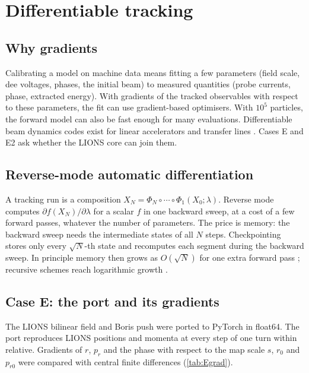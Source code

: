 \chapter{Differentiable tracking}\label{ch:differentiable}

\section{Why gradients}
Calibrating a model on machine data means fitting a few parameters (field scale, dee voltages, phases, the initial beam)
to measured quantities (probe currents, phase, extracted energy).
With gradients of the tracked observables with respect to these parameters, the fit can use gradient-based optimisers.
With $10^5$ particles, the forward model can also be fast enough for many evaluations.
Differentiable beam dynamics codes exist for linear accelerators and transfer lines \cite{kaiser2024}.
Cases E and E2 ask whether the LIONS core can join them.

\section{Reverse-mode automatic differentiation}
A tracking run is a composition $X_N = \Phi_N\circ\cdots\circ\Phi_1(X_0;\lambda)$.
Reverse mode computes $\partial f(X_N)/\partial\lambda$ for a scalar $f$ in one backward sweep, at a cost of a few forward
passes, whatever the number of parameters.
The price is memory: the backward sweep needs the intermediate states of all $N$ steps.
Checkpointing stores only every $\sqrt N$-th state and recomputes each segment during the backward sweep.
In principle memory then grows as $O(\sqrt N)$ for one extra forward pass \cite{chen2016}; recursive schemes reach
logarithmic growth \cite{griewank2000}.

\section{Case E: the port and its gradients}
The LIONS bilinear field and Boris push were ported to PyTorch \cite{paszke2019} in float64.
The port reproduces LIONS positions and momenta at every step of one turn within \EPortMax{} relative.
Gradients of $r$, $p_r$ and the phase with respect to the map scale $s$, $r_0$ and $p_{r0}$ were compared with central finite
differences (\cref{tab:Egrad}).

\begin{table}[h]
\centering\small
\caption{Case E: maximum relative difference between autograd and central finite differences at the registered steps
($10^{-6}$ relative for $s$, \SI{1e-7}{m} for $r_0$, $10^{-7}$ for $p_{r0}$).}
\label{tab:Egrad}

\end{table}

